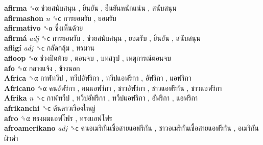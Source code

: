 \textbf{afirma} ␝α   ช่วยสนับสนุน ,  ยืนยัน ,  ยืนยันหนักแน่น ,  สนับสนุน   \\
\textbf{afirmashon} \emph{n}  ␝ϲ   การยอมรับ ,  ยอมรับ   \\
\textbf{afirmativo} ␝α   ซึ่งเห็นด้วย   \\
\textbf{afirmá} \emph{adj}  ␝ϲ   การยอมรับ ,  ช่วยสนับสนุน ,  ยอมรับ ,  ยืนยัน ,  สนับสนุน   \\
\textbf{afligí} \emph{adj}  ␝ϲ   กลัดกลุ้ม ,  ทรมาน   \\
\textbf{afloop} ␝α   ช่วงปิดท้าย ,  ตอนจบ ,  บทสรุป ,  เหตุการณ์ตอนจบ   \\
\textbf{afo} ␝α   กลางแจ้ง ,  ข้างนอก   \\
\textbf{Africa} ␝α   กาฬทวีป ,  ทวีปอัฟริกา ,  ทวีปแอฟริกา ,  อัฟริกา ,  แอฟริกา   \\
\textbf{Africano} ␝α   คนอัฟริกา ,  คนแอฟริกา ,  ชาวอัฟริกา ,  ชาวแอฟริกัน ,  ชาวแอฟริกา   \\
\textbf{Afrika} \emph{n}  ␝ϲ   กาฬทวีป ,  ทวีปอัฟริกา ,  ทวีปแอฟริกา ,  อัฟริกา ,  แอฟริกา   \\
\textbf{afrikanchi} ␝ϲ   ต้นดาวเรืองใหญ่   \\
\textbf{afro} ␝α   ทรงผมแอฟโฟร ,  ทรงแอฟโฟร   \\
\textbf{afroamerikano} \emph{adj}  ␝ϲ   คนอเมริกันเชื้อสายแอฟริกัน ,  ชาวอเมริกันเชื้อสายแอฟริกัน ,  อเมริกันผิวดำ   \\
